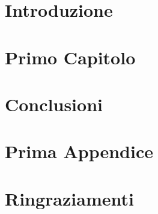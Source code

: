 \documentclass[12pt,a4paper,openright,twoside]{report}
\begin{document}

\blankpage



\chapter*{Introduzione}


\blankpage
\tableofcontents

\rhead[\fancyplain{}{\bfseries\leftmark}]{\fancyplain{}{\bfseries\thepage}}
\blankpage
\listoffigures
\blankpage
\listoftables
\blankpage

\chapter{Primo Capitolo}


\chapter*{Conclusioni}


\appendix
\chapter{Prima Appendice}


\printbibliography[heading=bibintoc]
\blankpage

\chapter*{Ringraziamenti}

\end{document}
